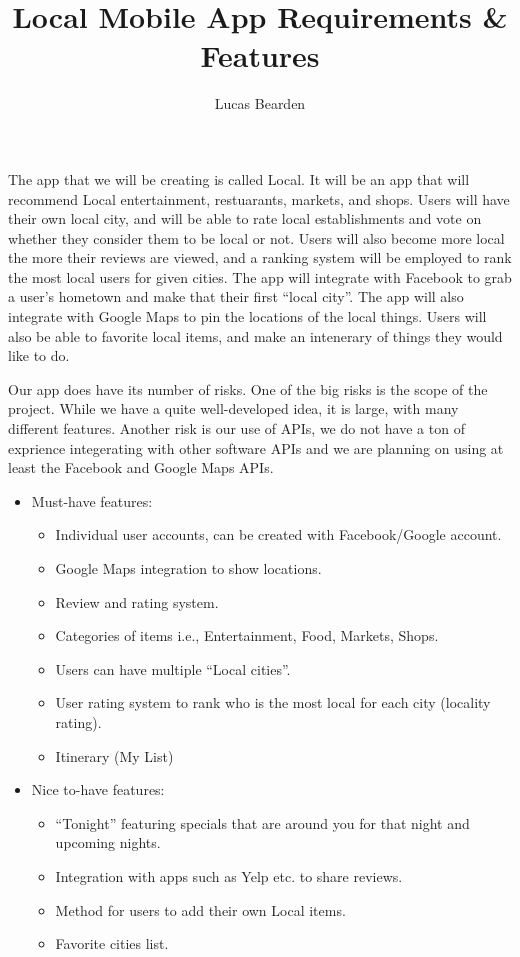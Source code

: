 \documentclass[11pt, oneside]{article}
\title{Local Mobile App Requirements & Features}
\author{Lucas Bearden}
\begin{document}
\maketitle
The app that we will be creating is called Local. It will be an app that will recommend Local entertainment, restuarants, markets, and shops. Users will have their own local city, and will be able to rate local establishments and vote on whether they consider them to be local or not. Users will also become more local the more their reviews are viewed, and a ranking system will be employed to rank the most local users for given cities. The app will integrate with Facebook to grab a user's hometown and make that their first ``local city''. The app will also integrate with Google Maps to pin the locations of the local things. Users will also be able to favorite local items, and make an intenerary of things they would like to do. 

Our app does have its number of risks. One of the big risks is the scope of the project. While we have a quite well-developed idea, it is large, with many different features. Another risk is our use of APIs, we do not have a ton of exprience integerating with other software APIs and we are planning on using at least the Facebook and Google Maps APIs.
\begin{itemize}
   \item Must-have features:
       \begin{itemize}
          \item Individual user accounts, can be created with Facebook/Google account.
          \item Google Maps integration to show locations.
          \item Review and rating system.
          \item Categories of items i.e., Entertainment, Food, Markets, Shops.
          \item Users can have multiple ``Local cities''.
          \item User rating system to rank who is the most local for each city (locality rating).
          \item Itinerary (My List)
       \end{itemize}  
   \item Nice to-have features:
       \begin{itemize}
          \item ``Tonight'' featuring specials that are around you for that night and upcoming nights.
          \item Integration with apps such as Yelp etc. to share reviews.
          \item Method for users to add their own Local items.
          \item Favorite cities list.
       \end{itemize}
  \end{itemize}
\end{document}
